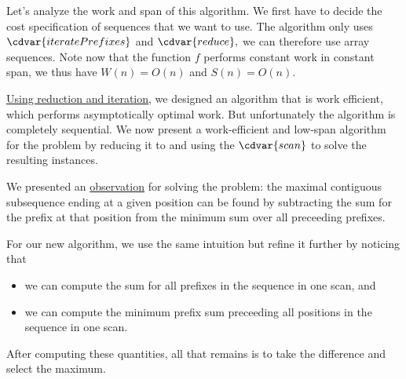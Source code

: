 \begin{gram}
Let's analyze the work and span of this algorithm.
%
We first have to decide the cost specification of sequences that we
want to use.
%
The algorithm only uses $\cdvar{iteratePrefixes}$ and $\cdvar{reduce},$ we
can therefore use array sequences.
%
Note now that the function $f$ performs constant work in constant
span, we thus have $W(n) = O(n)$ and $S(n) = O(n)$.
%
\end{gram}





\begin{gram}
\href{alg:mcs::iterative}{Using reduction and iteration}, we designed an algorithm that is work efficient, which performs asymptotically optimal work.
%
But unfortunately the algorithm is completely sequential.
%
We now present a work-efficient and low-span algorithm
for the \MCSS{} problem by reducing it to \MCSSE{} and using the
$\cdvar{scan}$ to solve the resulting \MCSSE{} instances.
\end{gram}

\begin{gram}
\label{gr:mcss::reduction:mcsse::optimal-reduction::intution}



We presented an
\href{gr:mcss::reduction::mcsse:simple::intuition}{observation} for solving the \MCSSE{} problem: the maximal contiguous
subsequence ending at a given position can be found by subtracting the
sum for the prefix at that position from the minimum sum over all
preceeding prefixes.

For our new algorithm, we use the same intuition but refine it
further by noticing that
\begin{itemize}
\item we can compute the sum for all prefixes in the sequence in one
  scan, and
\item we can compute the minimum prefix sum preceeding all positions
  in the sequence in one scan.
\end{itemize}

After computing these quantities, all that remains is to take the
difference and select the maximum.
%
\end{gram}


